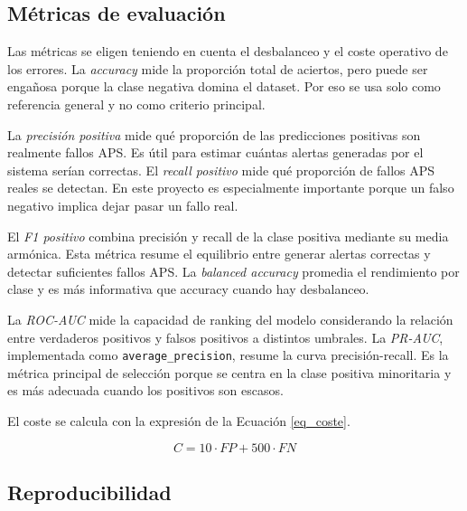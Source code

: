 \documentclass[11pt,a4paper]{article}
\begin{document}
\subsection{Métricas de evaluación}
\label{sec_metricas}

Las métricas se eligen teniendo en cuenta el desbalanceo y el coste operativo de los errores. La \textit{accuracy} mide la proporción total de aciertos, pero puede ser engañosa porque la clase negativa domina el dataset. Por eso se usa solo como referencia general y no como criterio principal.

La \textit{precisión positiva} mide qué proporción de las predicciones positivas son realmente fallos APS. Es útil para estimar cuántas alertas generadas por el sistema serían correctas. El \textit{recall positivo} mide qué proporción de fallos APS reales se detectan. En este proyecto es especialmente importante porque un falso negativo implica dejar pasar un fallo real.

El \textit{F1 positivo} combina precisión y recall de la clase positiva mediante su media armónica. Esta métrica resume el equilibrio entre generar alertas correctas y detectar suficientes fallos APS. La \textit{balanced accuracy} promedia el rendimiento por clase y es más informativa que accuracy cuando hay desbalanceo.

La \textit{ROC-AUC} mide la capacidad de ranking del modelo considerando la relación entre verdaderos positivos y falsos positivos a distintos umbrales. La \textit{PR-AUC}, implementada como \texttt{average\_precision}, resume la curva precisión-recall. Es la métrica principal de selección porque se centra en la clase positiva minoritaria y es más adecuada cuando los positivos son escasos.

El coste se calcula con la expresión de la Ecuación \ref{eq_coste}.

\begin{equation}
\label{eq_coste}
C = 10 \cdot FP + 500 \cdot FN
\end{equation}

\subsection{Reproducibilidad}
\label{sec_reproducibilidad}
\end{document}
